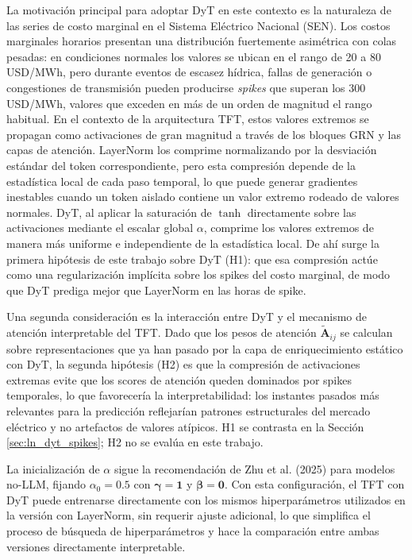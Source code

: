 La motivación principal para adoptar DyT en este contexto es la naturaleza de las series de costo marginal en el Sistema Eléctrico Nacional (SEN). Los costos marginales horarios presentan una distribución fuertemente asimétrica con colas pesadas: en condiciones normales los valores se ubican en el rango de 20 a 80 USD/MWh, pero durante eventos de escasez hídrica, fallas de generación o congestiones de transmisión pueden producirse \textit{spikes} que superan los 300 USD/MWh, valores que exceden en más de un orden de magnitud el rango habitual. En el contexto de la arquitectura TFT, estos valores extremos se propagan como activaciones de gran magnitud a través de los bloques GRN y las capas de atención. LayerNorm los comprime normalizando por la desviación estándar del token correspondiente, pero esta compresión depende de la estadística local de cada paso temporal, lo que puede generar gradientes inestables cuando un token aislado contiene un valor extremo rodeado de valores normales. DyT, al aplicar la saturación de $\tanh$ directamente sobre las activaciones mediante el escalar global $\alpha$, comprime los valores extremos de manera más uniforme e independiente de la estadística local. De ahí surge la primera hipótesis de este trabajo sobre DyT (H1): que esa compresión actúe como una regularización implícita sobre los spikes del costo marginal, de modo que DyT prediga mejor que LayerNorm en las horas de spike.

Una segunda consideración es la interacción entre DyT y el mecanismo de atención interpretable del TFT. Dado que los pesos de atención $\tilde{\mathbf{A}}_{ij}$ se calculan sobre representaciones que ya han pasado por la capa de enriquecimiento estático con DyT, la segunda hipótesis (H2) es que la compresión de activaciones extremas evite que los scores de atención queden dominados por spikes temporales, lo que favorecería la interpretabilidad: los instantes pasados más relevantes para la predicción reflejarían patrones estructurales del mercado eléctrico y no artefactos de valores atípicos. H1 se contrasta en la Sección \ref{sec:ln_dyt_spikes}; H2 no se evalúa en este trabajo.
 
La inicialización de $\alpha$ sigue la recomendación de Zhu et al. (2025) para modelos no-LLM, fijando $\alpha_0 = 0{.}5$ con $\boldsymbol{\gamma} = \mathbf{1}$ y $\boldsymbol{\beta} = \mathbf{0}$. Con esta configuración, el TFT con DyT puede entrenarse directamente con los mismos hiperparámetros utilizados en la versión con LayerNorm, sin requerir ajuste adicional, lo que simplifica el proceso de búsqueda de hiperparámetros y hace la comparación entre ambas versiones directamente interpretable.

